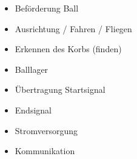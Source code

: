 \documentclass[a4paper,10pt,fleqn]{article}
\begin{document}
\begin{itemize}
    \item Beförderung Ball
    \item Ausrichtung / Fahren / Fliegen
    \item Erkennen des Korbs (finden)
    \item Balllager
    \item Übertragung Startsignal
    \item Endsignal
    \item Stromversorgung
    \item Kommunikation
\end{itemize}
\end{document}
